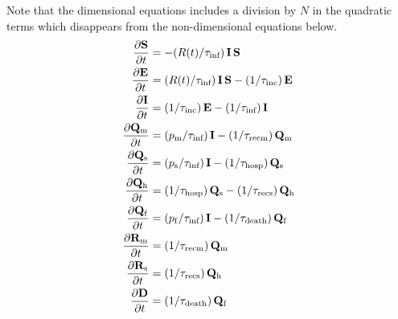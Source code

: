 \documentclass[twoside,11pt]{article}
\newcommand {\Dp}[2] {\frac{\partial #1}{\partial #2}}
\newcommand{\rmf}{\mathrm{f}}
\newcommand{\rmh}{\mathrm{h}}
\newcommand{\rmm}{\mathrm{m}}
\newcommand{\rms}{\mathrm{s}}
\newcommand{\bmD}{{\mathbf{D}}}
\newcommand{\bmE}{{\mathbf{E}}}
\newcommand{\bmI}{{\mathbf{I}}}
\newcommand{\bmQ}{{\mathbf{Q}}}
\newcommand{\bmR}{{\mathbf{R}}}
\newcommand{\bmS}{{\mathbf{S}}}
\begin{document}
Note that the dimensional equations includes a division by $N$ in the quadratic terms which disappears from the non-dimensional
equations below.
%
\begin{align}
\Dp{\bmS}{t}      &=   -(R(t)/\Tinf)   \, \bmI \, \bmS                                     \label{eq:S} \\
\Dp{\bmE}{t}      &=    (R(t)/\Tinf)   \, \bmI \, \bmS  - (1/\Tinc )  \, \bmE              \label{eq:E} \\
\Dp{\bmI}{t}      &=    (1/\Tinc)      \, \bmE          - (1/\Tinf )  \, \bmI              \label{eq:I} \\
\Dp{\bmQ_\rmm}{t} &=    (p_\rmm/\Tinf) \, \bmI          - (1/\Trecm)  \, \bmQ_\rmm         \label{eq:Sm} \\
\Dp{\bmQ_\rms}{t} &=    (p_\rms/\Tinf) \, \bmI          - (1/\Thosp)  \, \bmQ_\rms         \label{eq:Sh} \\
\Dp{\bmQ_\rmh}{t} &=    (1/\Thosp)     \, \bmQ_\rms     - (1/\Trecs)  \, \bmQ_\rmh         \label{eq:Shos} \\
\Dp{\bmQ_\rmf}{t} &=    (p_\rmf/\Tinf) \, \bmI          - (1/\Tdeath) \,\bmQ_\rmf          \label{eq:Sdead} \\
\Dp{\bmR_\rmm }{t}&=    (1/\Trecm)     \, \bmQ_\rmm                                        \label{eq:Rm} \\
\Dp{\bmR_\rms}{t} &=    (1/\Trecs)     \, \bmQ_\rmh                                        \label{eq:E} \\
\Dp{\bmD     }{t} &=    (1/\Tdeath)    \, \bmQ_\rmf                                        \label{eq:E} 
\end{align}

%
\end{document}
